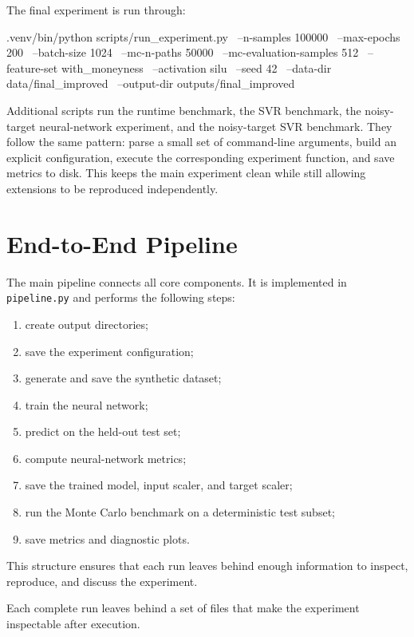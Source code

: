 The final experiment is run through:

\begin{projectlistingbox}[shellstyle]
.venv/bin/python scripts/run_experiment.py \
    --n-samples 100000 \
    --max-epochs 200 \
    --batch-size 1024 \
    --mc-n-paths 50000 \
    --mc-evaluation-samples 512 \
    --feature-set with_moneyness \
    --activation silu \
    --seed 42 \
    --data-dir data/final_improved \
    --output-dir outputs/final_improved
\end{projectlistingbox}

Additional scripts run the runtime benchmark, the SVR benchmark, the noisy-target neural-network experiment, and the noisy-target SVR benchmark.
They follow the same pattern: parse a small set of command-line arguments, build an explicit configuration, execute the corresponding experiment function, and save metrics to disk.
This keeps the main experiment clean while still allowing extensions to be reproduced independently.

\section{End-to-End Pipeline}

The main pipeline connects all core components.
It is implemented in \texttt{pipeline.py} and performs the following steps:

\begin{enumerate}
    \item create output directories;
    \item save the experiment configuration;
    \item generate and save the synthetic dataset;
    \item train the neural network;
    \item predict on the held-out test set;
    \item compute neural-network metrics;
    \item save the trained model, input scaler, and target scaler;
    \item run the Monte Carlo benchmark on a deterministic test subset;
    \item save metrics and diagnostic plots.
\end{enumerate}
This structure ensures that each run leaves behind enough information to inspect, reproduce, and discuss the experiment.

Each complete run leaves behind a set of files that make the experiment inspectable after execution.

